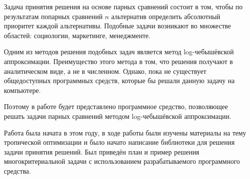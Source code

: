 \documentclass[specialist,
	substylefile = spbu_report.rtx,
	subf,href,colorlinks=true, 12pt]{disser}
\begin{document}
\maketitle
\newpage
\tableofcontents
\intro

Задача принятия решения на основе парных сравнений состоит в том, чтобы по результатам попарных сравнений $n$ альтернатив определить абсолютный приоритет каждой альтернативы. Подобные задачи возникают во множестве областей: социологии, маркетинге, менеджменте.

Одним из методов решения подобных задач является метод log-чебышёвской аппроксимации. Преимущество этого метода в том, что решения получают в аналитическом виде, а не в численном. Однако, пока не существует общедоступных программных средств, которые бы решали данную задачу на компьютере.

Поэтому в работе будет представлено программное средство, позволяющее решать задачи парных сравнений методом log-чебышёвской аппроксимации.

Работа была начата в этом году, в ходе работы были изучены материалы на тему тро­пической оптимизации и было начато написание библиотеки для решения задачи принятия решений. Был приведён план
и пример решения многокритериальной задачи с использованием разрабатываемого программного средства.
\end{document}
